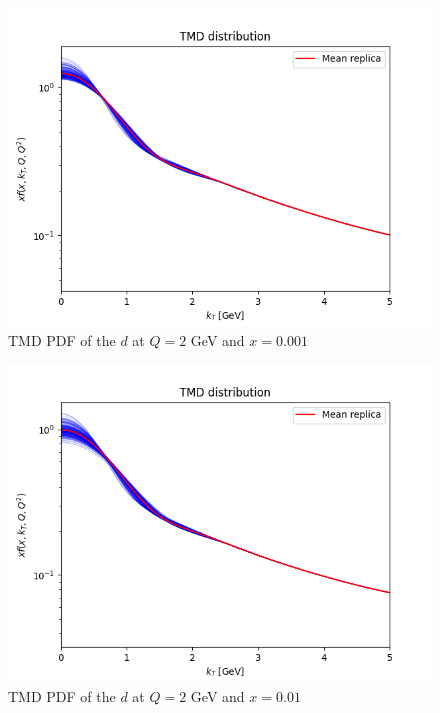 \documentclass[
]{article}
\begin{document}
\begin{figure}
\centering
\includegraphics{pngplots/tmd_1_2_0.001.png}
\caption{TMD PDF of the \(d\) at \(Q = 2\) GeV and \(x = 0.001\)}
\end{figure}

\begin{figure}
\centering
\includegraphics{pngplots/tmd_1_2_0.01.png}
\caption{TMD PDF of the \(d\) at \(Q = 2\) GeV and \(x = 0.01\)}
\end{figure}
\end{document}
